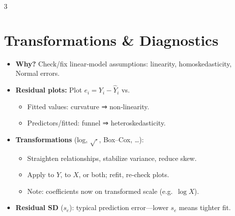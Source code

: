 \documentclass[10pt,landscape]{article}
\begin{document}
\begin{multicols}{3}
\section{Transformations \& Diagnostics}
\begin{itemize}
  \item \textbf{Why?} Check/fix linear‐model assumptions: linearity, homoskedasticity, Normal errors.
  \item \textbf{Residual plots:} Plot $e_i=Y_i-\hat Y_i$ vs.
    \begin{itemize}
      \item Fitted values: curvature ⇒ non‐linearity.
      \item Predictors/fitted: funnel ⇒ heteroskedasticity.
    \end{itemize}
  \item \textbf{Transformations} (log, $\sqrt{\cdot}$, Box–Cox, …):
    \begin{itemize}
      \item Straighten relationships, stabilize variance, reduce skew.
      \item Apply to $Y$, to $X$, or both; refit, re‐check plots.
      \item Note: coefficients now on transformed scale (e.g.\ $\log X$).
    \end{itemize}
  \item \textbf{Residual SD} ($s_e$): typical prediction error—lower $s_e$ means tighter fit.
\end{itemize}


\end{multicols}
\end{document}
